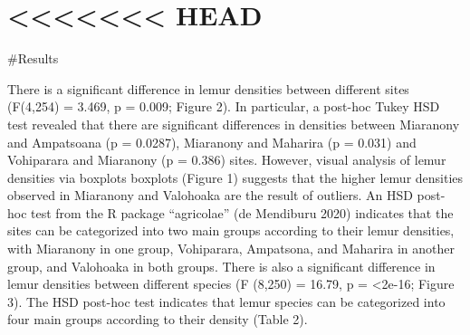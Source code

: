 \documentclass[
  12pt,
]{article}
\begin{document}
\hypertarget{head}{%
\section{\textless\textless\textless\textless\textless\textless\textless{}
HEAD}\label{head}}

\#Results

There is a significant difference in lemur densities between different
sites (F(4,254) = 3.469, p = 0.009; Figure 2). In particular, a post-hoc
Tukey HSD test revealed that there are significant differences in
densities between Miaranony and Ampatsoana (p = 0.0287), Miaranony and
Maharira (p = 0.031) and Vohiparara and Miaranony (p = 0.386) sites.
However, visual analysis of lemur densities via boxplots boxplots
(Figure 1) suggests that the higher lemur densities observed in
Miaranony and Valohoaka are the result of outliers. An HSD post-hoc test
from the R package ``agricolae'' (de Mendiburu 2020) indicates that the
sites can be categorized into two main groups according to their lemur
densities, with Miaranony in one group, Vohiparara, Ampatsona, and
Maharira in another group, and Valohoaka in both groups. There is also a
significant difference in lemur densities between different species (F
(8,250) = 16.79, p = \textless2e-16; Figure 3). The HSD post-hoc test
indicates that lemur species can be categorized into four main groups
according to their density (Table 2).
\end{document}
